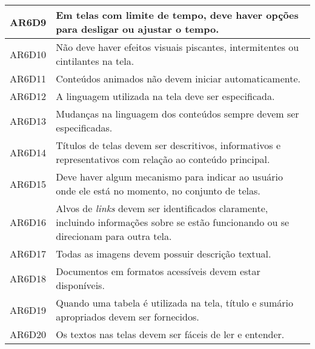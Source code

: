\begin{table}[htb]
\begin{center}
\begin{tabular}{p{1.2cm}|p{13.5cm}}
      \hline
      AR6D9           & Em telas com limite de tempo, deve haver opções para desligar ou ajustar o tempo.                                                            \\
      \hline
      AR6D10          & Não deve haver efeitos visuais piscantes, intermitentes ou cintilantes na tela.                                                              \\
      \hline
      AR6D11          & Conteúdos animados não devem iniciar automaticamente.                                                                                        \\
      \hline
      AR6D12          & A linguagem utilizada na tela deve ser especificada.                                                                                         \\
      \hline
      AR6D13          & Mudanças na linguagem dos conteúdos sempre devem ser especificadas.                                                                          \\
      \hline
      AR6D14          & Títulos de telas devem ser descritivos, informativos e representativos com relação ao conteúdo principal.                                    \\
      \hline
      AR6D15          & Deve haver algum mecanismo para indicar ao usuário onde ele está no momento, no conjunto de telas.                                           \\
      \hline
      AR6D16          & Alvos de \emph{links} devem ser identificados claramente, incluindo informações sobre se estão funcionando ou se direcionam para outra tela. \\
      \hline
      AR6D17          & Todas as imagens devem possuir descrição textual.                                                                                            \\
      \hline
      AR6D18          & Documentos em formatos acessíveis devem estar disponíveis.                                                                                   \\
      \hline
      AR6D19          & Quando uma tabela é utilizada na tela, título e sumário apropriados devem ser fornecidos.                                                    \\
      \hline
      AR6D20          & Os textos nas telas devem ser fáceis de ler e entender.                                                                                      \\

\end{tabular}
\end{center}
\end{table}
